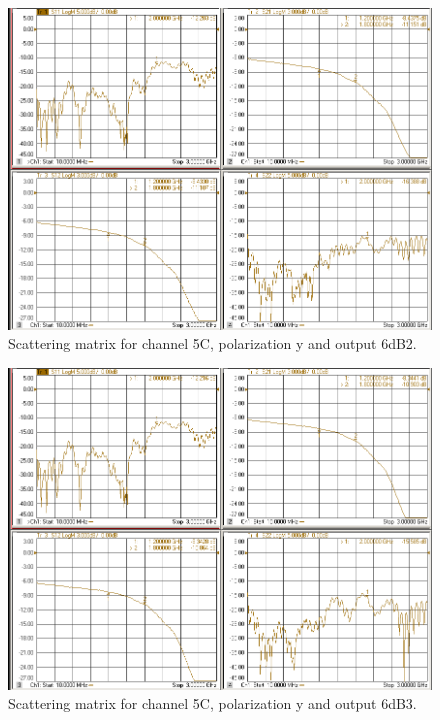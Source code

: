\documentclass[12pt,a4paper,oneside]{article}
\begin{document}
\begin{figure}[H]
\centering
\includegraphics[width=0.9\linewidth]{VNA_results/5Cy_6dB2.png}
\caption{Scattering matrix for channel 5C, polarization y and output 6dB2.}
\label{fig:5Cy_6dB2}
\end{figure}


\begin{figure}[H]
\centering
\includegraphics[width=0.9\linewidth]{VNA_results/5Cy_6dB3.png}
\caption{Scattering matrix for channel 5C, polarization y and output 6dB3.}
\label{fig:5Cy_6dB3}
\end{figure}
\end{document}
